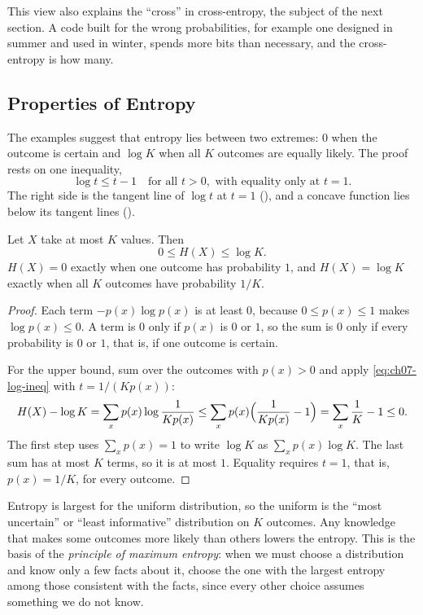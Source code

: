 This view also explains the ``cross'' in cross-entropy, the subject of
the next section. A code built for the wrong probabilities, for example
one designed in summer and used in winter, spends more bits than
necessary, and the cross-entropy is how many.

\subsection{Properties of Entropy}
\label{sec:ch07-entropy-props}

The examples suggest that entropy lies between two extremes: $0$ when the
outcome is certain and $\log K$ when all $K$ outcomes are equally likely.
The proof rests on one inequality,
\begin{equation}
  \log t \le t - 1 \quad \text{for all } t > 0,
  \text{ with equality only at } t = 1 .
  \label{eq:ch07-log-ineq}
\end{equation}
The right side is the tangent line of $\log t$ at $t = 1$
(), and a concave function lies below its
tangent lines ().

\begin{proposition}
  \label{prop:ch07-entropy-range}
  Let $X$ take at most $K$ values. Then
  \[
    0 \le H(X) \le \log K .
  \]
  $H(X) = 0$ exactly when one outcome has probability $1$, and $H(X) =
  \log K$ exactly when all $K$ outcomes have probability $1/K$.
\end{proposition}

\begin{proof}
  Each term $-p(x) \log p(x)$ is at least $0$, because $0 \le p(x) \le 1$
  makes $\log p(x) \le 0$. A term is $0$ only if $p(x)$ is $0$ or $1$, so
  the sum is $0$ only if every probability is $0$ or $1$, that is, if one
  outcome is certain.

  For the upper bound, sum over the outcomes with $p(x) > 0$ and apply
  \cref{eq:ch07-log-ineq} with $t = 1/(K p(x))$:
  \[
    H(X) - \log K = \sum_x p(x) \log \frac{1}{K p(x)}
    \le \sum_x p(x) \Bigl( \frac{1}{K p(x)} - 1 \Bigr)
    = \sum_x \frac{1}{K} - 1 \le 0 .
  \]
  The first step uses $\sum_x p(x) = 1$ to write $\log K$ as $\sum_x p(x)
  \log K$. The last sum has at most $K$ terms, so it is at most $1$.
  Equality requires $t = 1$, that is, $p(x) = 1/K$, for every outcome.
\end{proof}

Entropy is largest for the uniform distribution, so the uniform is the
``most uncertain'' or ``least informative'' distribution on $K$ outcomes.
Any knowledge that makes some outcomes more likely than others lowers the
entropy. This is the basis of the \emph{principle of maximum entropy}:
when we must choose a distribution and know only a few facts about it,
choose the one with the largest entropy among those consistent with the
facts, since every other choice assumes something we do not know.

